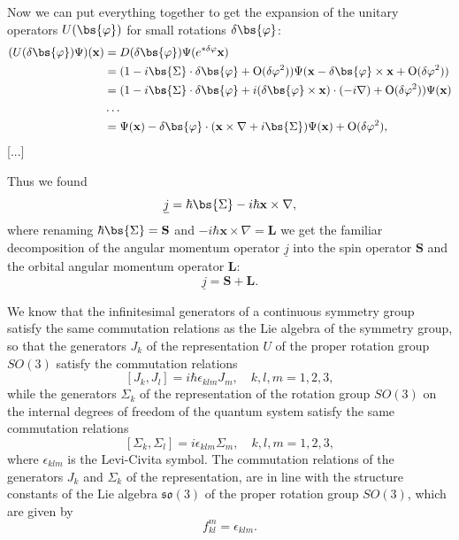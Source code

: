 \begin{example}
    Now we can put everything together to get the expansion of the unitary operators \(U(\bs{\varphi})\) for small rotations \(\delta \bs{\varphi}\):
    \[
        \begin{aligned}
            (U(\delta \bs{\varphi})\Psi)(\mathbf{x}) & = D(\delta \bs{\varphi})\Psi(e^{* \delta \varphi}\mathbf{x})                                                                                                          \\
                                                     & = (1 - i \bs{\Sigma} \cdot \delta \bs{\varphi} + \mathrm{O}(\delta \varphi^2))\Psi(\mathbf{x} - \delta \bs{\varphi} \times \mathbf{x} + \mathrm{O}(\delta \varphi^2)) \\
                                                     & = (1 - i \bs{\Sigma} \cdot \delta \bs{\varphi} + i (\delta \bs{\varphi} \times \mathbf{x}) \cdot (-i\nabla) + \mathrm{O}(\delta \varphi^2))\Psi(\mathbf{x})           \\
                                                     & \dots                                                                                                                                                                 \\
                                                     & = \Psi(\mathbf{x}) - \delta \bs{\varphi} \cdot (\mathbf{x} \times \nabla + i \bs{\Sigma})\Psi(\mathbf{x}) + \mathrm{O}(\delta \varphi^2),
        \end{aligned}
    \]
    [...]

    Thus we found
    \[
        \underline{j} = \hbar \bs{\Sigma} - i\hbar \mathbf{x} \times \nabla,
    \]
    where renaming \(\hbar \bs{\Sigma} = \mathbf{S}\) and \(-i \hbar \mathbf{x} \times \nabla = \mathbf{L}\) we get the familiar decomposition of the angular momentum operator \(\underline{j}\) into the spin operator \(\mathbf{S}\) and the orbital angular momentum operator \(\mathbf{L}\):
    \[
        \underline{j} = \mathbf{S} + \mathbf{L}.
    \]

    We know that the infinitesimal generators of a continuous symmetry group satisfy the same commutation relations as the Lie algebra of the symmetry group, so that the generators \(J_k\) of the representation \(U\) of the proper rotation group \(SO(3)\) satisfy the commutation relations
    \[
        [J_k, J_l] = i \hbar \epsilon_{klm} J_m, \quad k, l, m = 1, 2, 3,
    \]
    while the generators \(\Sigma_k\) of the representation of the rotation group \(SO(3)\) on the internal degrees of freedom of the quantum system satisfy the same commutation relations
    \[
        [\Sigma_k, \Sigma_l] = i \epsilon_{klm} \Sigma_m, \quad k, l, m = 1, 2, 3,
    \]
    where \(\epsilon_{klm}\) is the Levi-Civita symbol. The commutation relations of the generators \(J_k\) and \(\Sigma_k\) of the representation, are in line with the structure constants of the Lie algebra \(\mathfrak{so}(3)\) of the proper rotation group \(SO(3)\), which are given by
    \[
        f^m_{kl} = \epsilon_{klm}.
    \]


\end{example}
